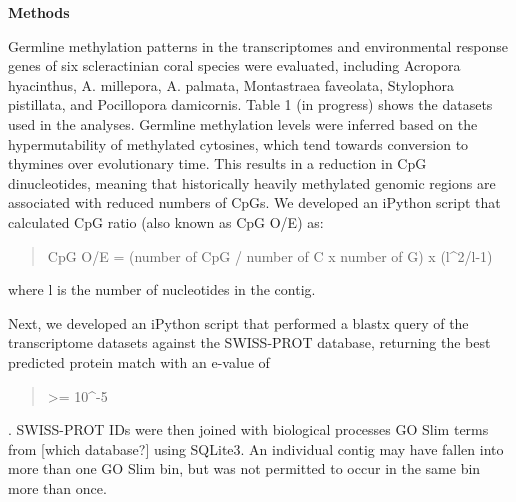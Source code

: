 \textbf{Methods}

Germline methylation patterns in the transcriptomes and environmental response genes of six scleractinian coral species were evaluated, including Acropora hyacinthus, A. millepora, A. palmata, Montastraea faveolata, Stylophora pistillata, and Pocillopora damicornis. Table 1 (in progress) shows the datasets used in the analyses. Germline methylation levels were inferred based on the hypermutability of methylated cytosines, which tend towards conversion to thymines over evolutionary time. This results in a reduction in CpG dinucleotides, meaning that historically heavily methylated genomic regions are associated with reduced numbers of CpGs. We developed an iPython script that calculated CpG ratio (also known as CpG O/E) as:

\begin{quote}
CpG O/E = (number of CpG / number of C x number of G) x (l^2/l-1)
\end{quote}

where l is the number of nucleotides in the contig.

Next, we developed an iPython script that performed a blastx query of the transcriptome datasets against the SWISS-PROT database, returning the best predicted protein match with an e-value of \begin{quote}
>= 10^-5
\end{quote}. SWISS-PROT IDs were then joined with biological processes GO Slim terms from [which database?] using SQLite3. An individual contig may have fallen into more than one GO Slim bin, but was not permitted to occur in the same bin more than once.
